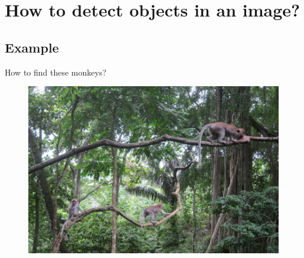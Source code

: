 \documentclass{beamer}[10pt, usepdftitle=false, handout]
\begin{document}
	    	        
	\section{How to detect objects in an image?}    
    \subsection{Example}
    \begin{frame}
    How to find these monkeys?
    \vspace*{1.0em}	
	
	\begin{figure}
		\includegraphics[scale=0.3]{monkey-1.jpg} 
	\end{figure}

   \end{frame}
    
\end{document}
